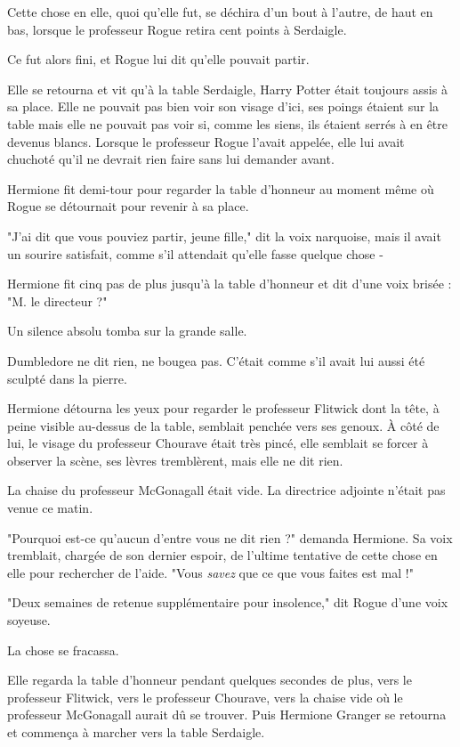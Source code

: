 Cette chose en elle, quoi qu'elle fut, se déchira d'un bout à l'autre, de haut en bas, lorsque le professeur Rogue retira cent points à Serdaigle.

Ce fut alors fini, et Rogue lui dit qu'elle pouvait partir.

Elle se retourna et vit qu'à la table Serdaigle, Harry Potter était toujours assis à sa place. Elle ne pouvait pas bien voir son visage d'ici, ses poings étaient sur la table mais elle ne pouvait pas voir si, comme les siens, ils étaient serrés à en être devenus blancs. Lorsque le professeur Rogue l'avait appelée, elle lui avait chuchoté qu'il ne devrait rien faire sans lui demander avant.

Hermione fit demi-tour pour regarder la table d'honneur au moment même où Rogue se détournait pour revenir à sa place.

"J'ai dit que vous pouviez partir, jeune fille," dit la voix narquoise, mais il avait un sourire satisfait, comme s'il attendait qu'elle fasse quelque chose -

Hermione fit cinq pas de plus jusqu'à la table d'honneur et dit d'une voix brisée : "M. le directeur ?"

Un silence absolu tomba sur la grande salle.

Dumbledore ne dit rien, ne bougea pas. C'était comme s'il avait lui aussi été sculpté dans la pierre.

Hermione détourna les yeux pour regarder le professeur Flitwick dont la tête, à peine visible au-dessus de la table, semblait penchée vers ses genoux. À côté de lui, le visage du professeur Chourave était très pincé, elle semblait se forcer à observer la scène, ses lèvres tremblèrent, mais elle ne dit rien.

La chaise du professeur McGonagall était vide. La directrice adjointe n'était pas venue ce matin.

"Pourquoi est-ce qu'aucun d'entre vous ne dit rien ?" demanda Hermione. Sa voix tremblait, chargée de son dernier espoir, de l'ultime tentative de cette chose en elle pour rechercher de l'aide. "Vous \emph{savez}  que ce que vous faites est mal !"

"Deux semaines de retenue supplémentaire pour insolence," dit Rogue d'une voix soyeuse.

La chose se fracassa.

Elle regarda la table d'honneur pendant quelques secondes de plus, vers le professeur Flitwick, vers le professeur Chourave, vers la chaise vide où le professeur McGonagall aurait dû se trouver. Puis Hermione Granger se retourna et commença à marcher vers la table Serdaigle.


